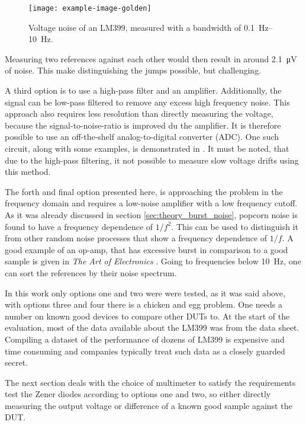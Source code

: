 \begin{figure}[ht]
    \centering
    \texttt{[image: example-image-golden]}
    \caption{Voltage noise of an LM399, measured with a bandwidth of \qtyrange{0.1}{10}{\Hz}.}
    \label{fig:noise_lm399}
\end{figure}

Measuring two references against each other would then result in around \qty{2.1}{\micro \volt} of noise. This make distinguishing the jumps possible, but challenging.

A third option is to use a high-pass filter and an amplifier. Additionally, the signal can be low-pass filtered to remove any excess high frequency noise. This approach also requires less resolution than directly measuring the voltage, because the signal-to-noise-ratio is improved du the amplifier. It is therefore possible to use an off-the-shelf analog-to-digital converter (ADC). One such circuit, along with some examples, is demonstrated in \cite{technote_ti_popcorn_noise,kay2012operational}. It must be noted, that due to the high-pass filtering, it not possible to measure slow voltage drifts using this method.

The forth and final option presented here, is approaching the problem in the frequency domain and requires a low-noise amplifier with a low frequency cutoff. As it was already discussed in section \ref{sec:theory_burst_noise}, popcorn noise is found to have a frequency dependence of $1/f^2$. This can be used to distinguish it from other random noise processes that show a frequency dependence of $1/f$. A good example of an op-amp, that has excessive burst in comparison to a good sample is given in \textit{The Art of Electronics} . Going to frequencies below \qty{10}{\Hz}, one can sort the references by their noise spectrum.

In this work only options one and two were were tested, as it was said above, with options three and four there is a chicken and egg problem. One needs a number on known good devices to compare other DUTs to. At the start of the evaluation, most of the data available about the LM399 was from the data sheet. Compiling a dataset of the performance of dozens of LM399 is expensive and time consuming and companies typically treat such data as a closely guarded secret.

The next section deals with the choice of multimeter to satisfy the requirements test the Zener diodes according to options one and two, so either directly measuring the output voltage or difference of a known good sample against the DUT.

